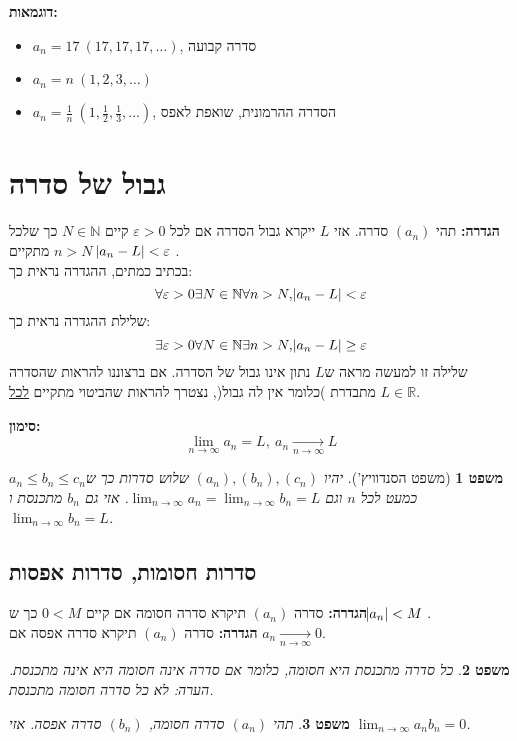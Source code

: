 \documentclass[11pt, oneside]{article}
\newcommand{\opr}[1]{\xrightarrow[\text{#1}]{}}
\newcommand{\mR}{\mathbb{R}}
\newcommand{\mN}{\mathbb{N}}
\newtheorem{theorem}{משפט}
\newenvironment{definition}{\textbf{הגדרה:}}{\\}
\newenvironment{marking}{\textbf{סימון:} \begin{equation*}}{\end{equation*}}
\newenvironment{examples}{\textbf{דוגמאות:} \begin{itemize}}{\end{itemize}}
\begin{document}
\begin{examples}
\item $a_{n} = 17\ (17, 17, 17, \ldots)$, סדרה קבועה
\item $a_{n} = n\ (1, 2, 3, \ldots)$
\item $a_{n} = \frac{1}{n}\ (1, \frac{1}{2}, \frac{1}{3}, \ldots)$, הסדרה ההרמונית, שואפת לאפס
\end{examples}
\clearpage

\section*{גבול של סדרה}
\begin{definition}
תהי $(a_{n})$ סדרה. אזי $L$ ייקרא גבול הסדרה אם לכל $\varepsilon > 0$ קיים $N \in \mN$ כך שלכל $n > N$ מתקיים $\abs{a_{n} - L} < \varepsilon$ .
\end{definition}
בכתיב כמתים, ההגדרה נראית כך:
\[
\forall \varepsilon > 0 \exists N \in \mN \forall n > N, \abs{a_{n} - L} < \varepsilon
\]
שלילת ההגדרה נראית כך:
\[
\exists \varepsilon > 0 \forall N \in \mN \exists n > N, \abs{a_{n} - L} \ge \varepsilon
\]
שלילה זו למעשה מראה ש$L$ נתון אינו גבול של הסדרה. אם ברצוננו להראות שהסדרה מתבדרת )כלומר אין לה גבול(, נצטרך להראות שהביטוי מתקיים \underline{לכל} $L \in \mR$.

\begin{marking}
\lim_{n \to \infty} a_{n} = L,\ a_{n} \opr{$n \to \infty$} L
\end{marking}

\begin{theorem}[משפט הסנדוויץ']
יהיו $(a_{n}), (b_{n}), (c_{n})$ שלוש סדרות כך ש$a_{n} \le b_{n} \le c_{n}$ כמעט לכל $n$ וגם $\lim_{n \to \infty} a_{n} = \lim_{n \to \infty} b_{n} = L$. אזי גם $b_{n}$ מתכנסת ו$\lim_{n \to \infty} b_{n} = L$.
\end{theorem}

\subsection*{סדרות חסומות, סדרות אפסות}
\begin{definition}
סדרה $(a_{n})$ תיקרא סדרה חסומה אם קיים $0 < M$ כך ש$\abs{a_{n}} < M$ .
\end{definition}
\begin{definition}
סדרה $(a_{n})$ תיקרא סדרה אפסה אם $a_{n} \opr{$n \to \infty$} 0$.
\end{definition}
\begin{theorem}
כל סדרה מתכנסת היא חסומה, כלומר אם סדרה אינה חסומה היא אינה מתכנסת. הערה: לא כל סדרה חסומה מתכנסת.
\end{theorem}
\begin{theorem}
תהי $(a_{n})$ סדרה חסומה, $(b_{n})$ סדרה אפסה. אזי $\lim_{n \to \infty} a_{n}b_{n} = 0$.
\end{theorem}
\end{document}
